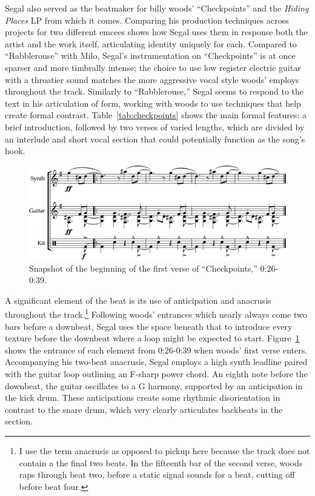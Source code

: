 Segal also served as the beatmaker for billy woods' ``Checkpoints'' and the \textit{Hiding Places} LP from which it comes. Comparing his production techniques across projects for two different emcees shows how Segal uses them in response both the artist and the work itself, articulating identity uniquely for each. Compared to ``Rabblerouse'' with Milo, Segal's instrumentation on ``Checkpoints'' is at once sparser and more timbrally intense; the choice to use low register electric guitar with a throatier sound matches the more aggressive vocal style woods' employs throughout the track. Similarly to ``Rabblerouse,'' Segal seems to respond to the text in his articulation of form, working with woods to use techniques that help create formal contrast. Table~\ref{tab:checkpoints} shows the main formal features: a brief introduction, followed by two verses of varied lengths, which are divided by an interlude and short vocal section that could potentially function as the song's hook.

    \begin{figure}[ht]
        \centering
        \includegraphics[width=\textwidth]{images/figures/chp 02/026039checkpointsintro.pdf}
        \caption{Snapshot of the beginning of the first verse of ``Checkpoints,'' 0:26-0:39.}
        \label{fig:checkpointsintro}
    \end{figure}

A significant element of the beat is its use of anticipation and anacrusis throughout the track.\footnote{I use the term anacrusis as opposed to pickup here because the track does not contain a the final two beats. In the fifteenth bar of the second verse, woods raps through beat two, before a static signal sounds for a beat, cutting off before beat four.} Following woods' entrances which nearly always come two bars before a downbeat, Segal uses the space beneath that to introduce every texture before the downbeat where a loop might be expected to start. Figure~\ref{fig:checkpointsintro} shows the entrance of each element from 0:26-0:39 when woods' first verse enters. Accompanying his two-beat anacrusis, Segal employs a high synth leadline paired with the guitar loop outlining an F-sharp power chord. An eighth note before the downbeat, the guitar oscillates to a G harmony, supported by an anticipation in the kick drum. These anticipations create some rhythmic disorientation in contrast to the snare drum, which very clearly articulates backbeats in the section.

